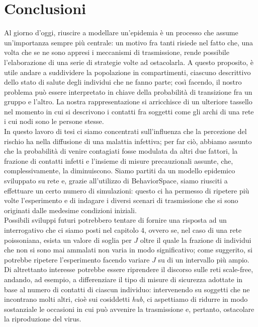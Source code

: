 \chapter{Conclusioni}
\label{chap:conclusioni}
Al giorno d'oggi, riuscire a modellare un'epidemia è un processo che assume un'importanza sempre più centrale: un motivo fra tanti risiede nel fatto che, una volta che se ne sono appresi i meccanismi di trasmissione, rende possibile l'elaborazione di una serie di strategie volte ad ostacolarla. A questo proposito, è utile andare a suddividere la popolazione in compartimenti, ciascuno descrittivo dello stato di salute degli individui che ne fanno parte; così facendo, il nostro problema può essere interpretato in chiave della probabilità di transizione fra un gruppo e l'altro. La nostra rappresentazione si arricchisce di un ulteriore tassello nel momento in cui si descrivono i contatti fra soggetti come gli archi di una rete i cui nodi sono le persone stesse.\\
In questo lavoro di tesi ci siamo concentrati sull'influenza che la percezione del rischio ha nella diffusione di una malattia infettiva; per far ciò, abbiamo assunto che la probabilità di venire contagiati fosse modulata da altri due fattori, la frazione di contatti infetti e l'insieme di misure precauzionali assunte, che, complessivamente, la diminuiscono. Siamo partiti da un modello epidemico sviluppato su rete e, grazie all'utilizzo di BehaviorSpace, siamo riusciti a effettuare un certo numero di simulazioni: questo ci ha permesso di ripetere più volte l'esperimento e di indagare i diversi scenari di trasmissione che si sono originati dalle medesime condizioni iniziali. \\
Possibili sviluppi futuri potrebbero tentare di fornire una risposta ad un interrogativo che ci siamo posti nel capitolo $ 4 $, ovvero se, nel caso di una rete poissoniana, esista un valore di soglia per $ J $ oltre il quale la frazione di individui che non si sono mai ammalati non varia in modo significativo; come suggerito, si potrebbe ripetere l'esperimento facendo variare $ J $ su di un intervallo più ampio. Di altrettanto interesse potrebbe essere riprendere il discorso sulle reti scale-free, andando, ad esempio, a differenziare il tipo di misure di sicurezza adottate in base al numero di contatti di ciascun individuo: intervenendo su soggetti che ne incontrano molti altri, cioè sui cosiddetti \emph{hub}, ci aspettiamo di ridurre in modo sostanziale le occasioni in cui può avvenire la trasmissione e, pertanto, ostacolare la riproduzione del virus.
	
	
	